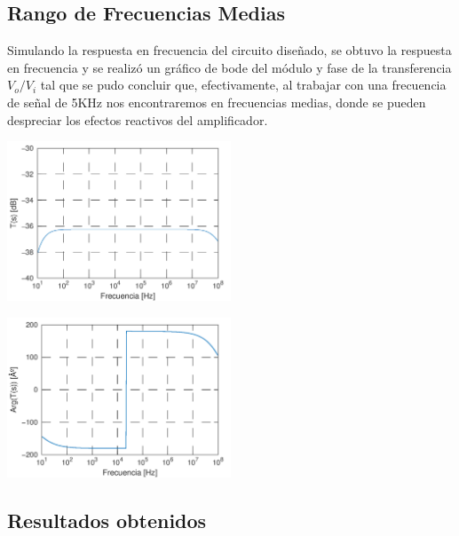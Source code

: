 \documentclass[a4paper, 10pt, spanish]{article}
\begin{document}
\subsection{Rango de Frecuencias Medias}

Simulando la respuesta en frecuencia del circuito diseñado, se obtuvo la respuesta en frecuencia y se realizó un gráfico de bode del módulo y fase de la transferencia $V_o/V_i$ tal que se pudo concluir que, efectivamente, al trabajar con una frecuencia de señal de 5KHz nos encontraremos en frecuencias medias, donde se pueden despreciar los efectos reactivos del amplificador.
\begin{center}
  \includegraphics[width=0.5\textwidth]{bode-a-mod.png}
  \label{fig:amp-mod-bode}
\end{center}

\begin{center}
  \includegraphics[width=0.5\textwidth]{bode-a-fase.png}
  \label{fig:amp-fase-bode}
\end{center}

\subsection{Resultados obtenidos}
\end{document}

